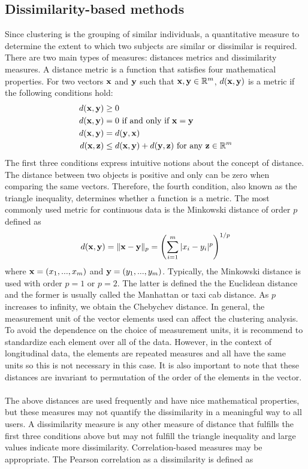 \subsection{Dissimilarity-based methods}
Since clustering is the grouping of similar individuals, a quantitative measure to determine the extent to which two subjects are similar or dissimilar is required.  There are two main types of measures: distances metrics and dissimilarity measures. A distance metric is a function that satisfies four mathematical properties. For two vectors $\mathbf x$ and $\mathbf y$ such that $\mathbf x,\mathbf y\in\mathbb{R}^{m}$, $d(\mathbf x,\mathbf y)$ is a metric if the following conditions hold:
\begin{align*}
d(\mathbf x,\mathbf y)&\geq 0 \\
d(\mathbf x,\mathbf y) &= 0\text{ if and only if } \mathbf x=\mathbf y\\
d(\mathbf x,\mathbf y) &= d(\mathbf y,\mathbf x)\\
d(\mathbf x,\mathbf z) &\leq d(\mathbf x,\mathbf y) + d(\mathbf y,\mathbf z)\text{ for any }\mathbf z\in \mathbb{R}^{m}
\end{align*}
The first three conditions express intuitive notions about the concept of distance. The distance between two objects is positive and only can be zero when comparing the same vectors. Therefore, the fourth condition, also known as the triangle inequality, determines whether a function is a metric. The most commonly used metric for continuous data is the Minkowski distance of order $p$ defined as
$$d(\mathbf x,\mathbf y) = \|\mathbf x - \mathbf y\|_{p} = \left(\sum^{m}_{i=1}|x_{i}-y_{i}|^{p}\right)^{1/p}$$
where $\mathbf x = (x_{1},...,x_{m})$ and $\mathbf y = (y_{1},...,y_{m})$. Typically, the Minkowski distance is used with order $p=1$ or $p=2$. The latter is defined the the Euclidean distance and the former is usually called the Manhattan or taxi cab distance. As $p$ increases to infinity, we obtain the Chebychev distance. In general, the measurement unit of the vector elements used can affect the clustering analysis. To avoid the dependence on the choice of measurement units, it is recommend to standardize each element over all of the data. However, in the context of longitudinal data, the elements are repeated measures and all have the same units so this is not necessary in this case. It is also important to note that these distances are invariant to permutation of the order of the elements in the vector.\\\\
The above distances are used frequently and have nice mathematical properties, but these measures may not quantify the dissimilarity in a meaningful way to all users. A dissimilarity measure is any other measure of distance that fulfills the first three conditions above but may not fulfill the triangle inequality and large values indicate more dissimilarity. Correlation-based measures may be appropriate. The Pearson correlation as a dissimilarity is defined as
